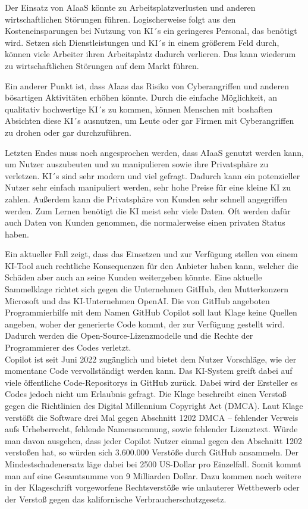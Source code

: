 Der Einsatz von AIaaS könnte zu Arbeitsplatzverlusten und anderen wirtschaftlichen Störungen führen. Logischerweise folgt aus den Kosteneinsparungen bei Nutzung von KI´s ein geringeres Personal, das benötigt wird. Setzen sich Dienstleistungen und KI´s in einem größerem Feld durch, können viele Arbeiter ihren Arbeitsplatz dadurch verlieren. Das kann wiederum zu wirtschaftlichen Störungen auf dem Markt führen.

Ein anderer Punkt ist, dass AIaas das Risiko von Cyberangriffen und anderen bösartigen Aktivitäten erhöhen könnte. Durch die einfache Möglichkeit, an qualitativ hochwertige KI´s zu kommen, können Menschen mit boshaften Absichten diese KI´s ausnutzen, um Leute oder gar Firmen mit Cyberangriffen zu drohen oder gar durchzuführen.

Letzten Endes muss noch angesprochen werden, dass AIaaS genutzt werden kann, um Nutzer auszubeuten und zu manipulieren sowie ihre Privatsphäre zu verletzen. KI´s sind sehr modern und viel gefragt. Dadurch kann ein potenzieller Nutzer sehr einfach manipuliert werden, sehr hohe Preise für eine kleine KI zu zahlen. Außerdem kann die Privatsphäre von Kunden sehr schnell angegriffen werden. Zum Lernen benötigt die KI meist sehr viele Daten. Oft werden dafür auch Daten von Kunden genommen, die normalerweise einen privaten Status haben. \cite[vgl.][]{InApp.2020}

Ein aktueller Fall zeigt, dass das Einsetzen und zur Verfügung stellen von einem KI-Tool auch rechtliche Konsequenzen für den Anbieter haben kann, welcher die Schäden aber auch an seine Kunden weitergeben könnte. Eine aktuelle Sammelklage richtet sich gegen die Unternehmen GitHub, den Mutterkonzern Microsoft und das KI-Unternehmen OpenAI. Die von GitHub angeboten Programmierhilfe mit dem Namen GitHub Copilot soll laut Klage keine Quellen angeben, woher der generierte Code kommt, der zur Verfügung gestellt wird. Dadurch werden die Open-Source-Lizenzmodelle und die Rechte der Programmierer des Codes verletzt. \\
Copilot ist seit Juni 2022 zugänglich und bietet dem Nutzer Vorschläge, wie der momentane Code vervollständigt werden kann. Das KI-System greift dabei auf viele öffentliche Code-Repositorys in GitHub zurück. Dabei wird der Ersteller es Codes jedoch nicht um Erlaubnis gefragt. Die Klage beschreibt einen Verstoß gegen die Richtlinien des Digital Millennium Copyright Act (DMCA). Laut Klage verstößt die Software drei Mal gegen Abschnitt 1202 DMCA – fehlender Verweis aufs Urheberrecht, fehlende Namensnennung, sowie fehlender Lizenztext. Würde man davon ausgehen, dass jeder Copilot Nutzer einmal gegen den Abschnitt 1202 verstoßen hat, so würden sich 3.600.000 Verstöße durch GitHub ansammeln. Der Mindestschadenersatz läge dabei bei 2500 US-Dollar pro Einzelfall. Somit kommt man auf eine Gesamtsumme von 9 Milliarden Dollar. Dazu kommen noch weitere in der Klageschrift vorgeworfene Rechtsverstöße wie unlauterer Wettbewerb oder der Verstoß gegen das kalifornische Verbraucherschutzgesetz. \cite[vgl.][]{Wittenhorst.2022}  \\